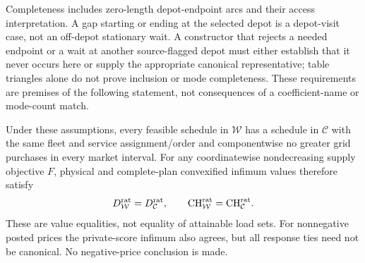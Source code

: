 Completeness includes zero-length depot-endpoint arcs and their access
interpretation. A gap starting or ending at the selected depot is a
depot-visit case, not an off-depot stationary wait. A constructor that
rejects a needed endpoint or a wait at another source-flagged depot must
either establish that it never occurs here or supply the appropriate
canonical representative; table triangles alone do not prove inclusion
or mode completeness. These requirements are premises of the following
statement, not consequences of a coefficient-name or mode-count match.

\begin{proposition}
\label{prop:exactenergydominance}
Under these assumptions, every feasible schedule in $\mathcal W$ has a
schedule in $\mathcal C$ with the same fleet and service assignment/order
and componentwise no greater grid purchases in every market interval.
For any coordinatewise nondecreasing supply objective $F$, physical and
complete-plan convexified infimum values therefore satisfy
\[
 D_{\mathcal W}^{\rm rat}=D_{\mathcal C}^{\rm rat},\qquad
 \mathrm{CH}_{\mathcal W}^{\rm rat}=\mathrm{CH}_{\mathcal C}^{\rm rat}.
\]
These are value equalities, not equality of attainable load sets. For
nonnegative posted prices the private-score infimum also agrees, but all
response ties need not be canonical. No negative-price conclusion is made.
\end{proposition}


